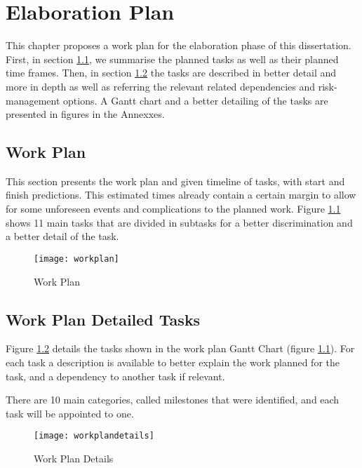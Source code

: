 
\chapter{Elaboration Plan}
\label{cha:elaboration_plan}

This chapter proposes a work plan for the elaboration phase of this dissertation. First, in section \ref{sec:workplan}, we summarise the planned tasks as well as their planned time frames. Then, in section \ref{sec:workplan_details} the tasks are described in better detail and more in depth as well as referring the relevant related dependencies and risk-management options. A Gantt chart and a better detailing of the tasks are presented in figures in the Annexxes.


\section{Work Plan}
\label{sec:workplan}

This section presents the work plan and given timeline of tasks, with start and finish predictions. This estimated times already contain a certain margin to allow for some unforeseen events and complications to the planned work. Figure \ref{fig:work_plan} shows 11 main tasks that are divided in subtasks for a better discrimination and a better detail of the task.

\begin{figure}[htbp]
	\centerline{\texttt{[image: workplan]}}%
	\caption{Work Plan}
	\label{fig:work_plan}
\end{figure}

\section{Work Plan Detailed Tasks}
\label{sec:workplan_details}

Figure \ref{fig:workplan_details} details the tasks shown in the work plan Gantt Chart (figure \ref{fig:work_plan}). For each task a description is available to better explain the work planned for the task, and a dependency to another task if relevant.

There are 10 main categories, called milestones that were identified, and each task will be appointed to one.

\begin{figure}[htbp]
	\centerline{\texttt{[image: workplandetails]}}%
	\caption{Work Plan Details}
	\label{fig:workplan_details}
\end{figure}